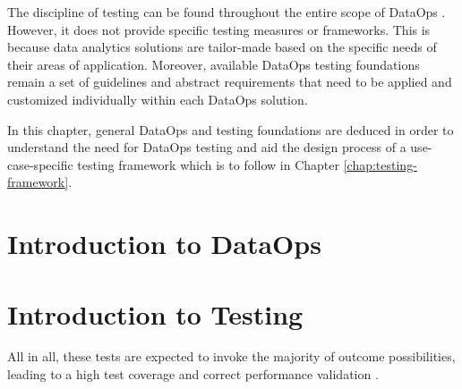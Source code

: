 
The discipline of testing can be found throughout the entire scope of DataOps \cite[42]{Schmidt2019}. However, it does not provide specific testing measures or frameworks. This is because data analytics solutions are tailor-made based on the specific needs of their areas of application. Moreover, available DataOps testing foundations remain a set of guidelines and abstract requirements that need to be applied and customized individually within each DataOps solution.

In this chapter, general DataOps and testing foundations are deduced in order to understand the need for DataOps testing and aid the design process of a use-case-specific testing framework which is to follow in Chapter \ref{chap:testing-framework}.


\section{Introduction to DataOps}
	\label{sec:2-dataops}
    
    

\section{Introduction to Testing}
	\label{sec:2-testing}
    


All in all, these tests are expected to invoke the majority of outcome possibilities, leading to a high test coverage and correct performance validation \cite{DataKitchen2020a}.
